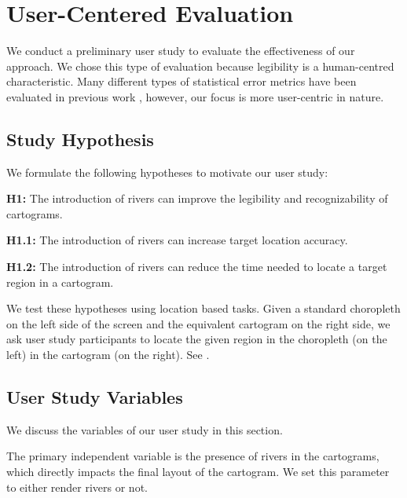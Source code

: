 \newcommand{\pCount}{24 }
\section{User-Centered Evaluation}

We conduct a preliminary user study to evaluate the effectiveness of our approach. We chose this type of evaluation because legibility is a human-centred characteristic. Many different types of statistical error metrics have been evaluated in previous work \cite{nusrat2016State}, however, our focus is more user-centric in nature.

\subsection{Study Hypothesis}

We formulate the following hypotheses to motivate our user study:

\textbf{H1:} The introduction of rivers can improve the legibility and recognizability of cartograms.

\textbf{H1.1:} The introduction of rivers can increase target location accuracy.

\textbf{H1.2:} The introduction of rivers can reduce the time needed to locate a target region in a cartogram.

We test these hypotheses using location based tasks. Given a standard choropleth on the left side of the screen and the equivalent cartogram on the right side, we ask user study participants to locate the given region in the choropleth (on the left) in the cartogram (on the right). See .

\subsection{User Study Variables}

We discuss the variables of our user study in this section.

The primary independent variable is the presence of rivers in the cartograms, which directly impacts the final layout of the cartogram. We set this parameter to either render rivers or not.



